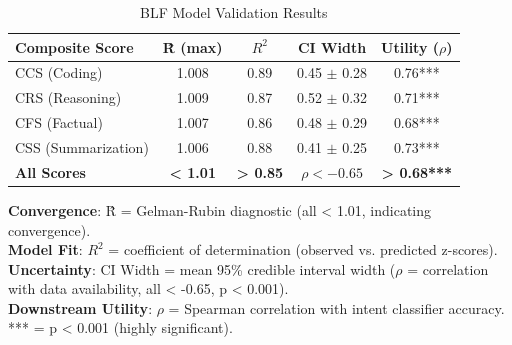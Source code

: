 \begin{table}[t]
\centering
\caption{BLF Model Validation Results}
\label{tab:blf_validation}
\small
\begin{tabular}{lcccc}
\toprule
\textbf{Composite Score} & \textbf{R̂ (max)} & \textbf{$R^2$} & \textbf{CI Width} & \textbf{Utility ($\rho$)} \\
\midrule
CCS (Coding)       & 1.008 & 0.89 & 0.45 $\pm$ 0.28 & 0.76*** \\
CRS (Reasoning)    & 1.009 & 0.87 & 0.52 $\pm$ 0.32 & 0.71*** \\
CFS (Factual)      & 1.007 & 0.86 & 0.48 $\pm$ 0.29 & 0.68*** \\
CSS (Summarization) & 1.006 & 0.88 & 0.41 $\pm$ 0.25 & 0.73*** \\
\midrule
\textbf{All Scores} & \textbf{< 1.01} & \textbf{> 0.85} & \textbf{$\rho < -0.65$} & \textbf{> 0.68***} \\
\bottomrule
\end{tabular}
\vspace{0.5em}
\begin{flushleft}
\footnotesize
\textbf{Convergence}: R̂ = Gelman-Rubin diagnostic (all < 1.01, indicating convergence). \\
\textbf{Model Fit}: $R^2$ = coefficient of determination (observed vs. predicted z-scores). \\
\textbf{Uncertainty}: CI Width = mean 95\% credible interval width ($\rho$ = correlation with data availability, all < -0.65, p < 0.001). \\
\textbf{Downstream Utility}: $\rho$ = Spearman correlation with intent classifier accuracy. \\
*** = p < 0.001 (highly significant).
\end{flushleft}
\end{table}
